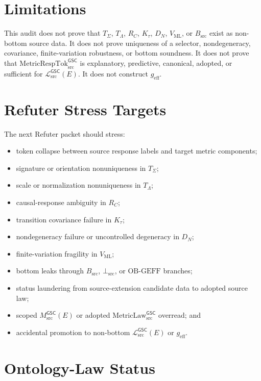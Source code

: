 \documentclass[11pt]{article}
\newcommand{\MsrcGSC}{M_{\mathrm{src}}^{\mathsf{GSC}}}
\newcommand{\MetricLaw}{\mathrm{MetricLaw}_{\mathrm{src}}^{\mathsf{GSC}}}
\newcommand{\MetricRespTok}{\mathrm{MetricRespTok}_{\mathrm{src}}^{\mathsf{GSC}}}
\newcommand{\MetricData}{\mathcal{L}_{\mathrm{src}}^{\mathsf{GSC}}}
\newcommand{\BottomSrc}{\bot_{\mathrm{src}}}
\newcommand{\OBGEFF}{\mathrm{OB\mbox{-}GEFF}}
\newcommand{\geff}{g_{\mathrm{eff}}}
\begin{document}
\section{Limitations}

This audit does not prove that \(T_{\Sigma}\), \(T_{\Lambda}\), \(R_C\),
\(K_{\tau}\), \(D_N\), \(V_{\mathrm{ML}}\), or \(B_{\mathrm{src}}\) exist as
non-bottom source data. It does not prove uniqueness of a selector,
nondegeneracy, covariance, finite-variation robustness, or bottom soundness.
It does not prove that \(\MetricRespTok\) is explanatory, predictive,
canonical, adopted, or sufficient for \(\MetricData(E)\). It does not construct
\(\geff\).

\section{Refuter Stress Targets}

The next Refuter packet should stress:

\begin{itemize}[leftmargin=*]
  \item token collapse between source response labels and target metric
  components;
  \item signature or orientation nonuniqueness in \(T_{\Sigma}\);
  \item scale or normalization nonuniqueness in \(T_{\Lambda}\);
  \item causal-response ambiguity in \(R_C\);
  \item transition covariance failure in \(K_{\tau}\);
  \item nondegeneracy failure or uncontrolled degeneracy in \(D_N\);
  \item finite-variation fragility in \(V_{\mathrm{ML}}\);
  \item bottom leaks through \(B_{\mathrm{src}}\), \(\BottomSrc\), or
  \(\OBGEFF\) branches;
  \item status laundering from source-extension candidate data to adopted
  source law;
  \item scoped \(\MsrcGSC(E)\) or adopted \(\MetricLaw\) overread; and
  \item accidental promotion to non-bottom \(\MetricData(E)\) or \(\geff\).
\end{itemize}

\section{Ontology-Law Status}
\end{document}
